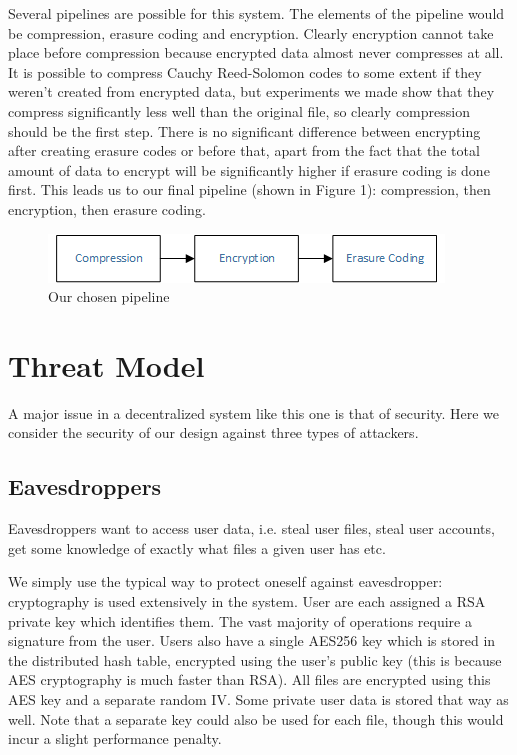 \documentclass{acm_}
\begin{document}
Several pipelines are possible for this system. The elements of the pipeline would be compression, erasure coding and encryption. Clearly encryption cannot take place before compression because encrypted data almost never compresses at all. It is possible to compress Cauchy Reed-Solomon codes to some extent if they weren't created from encrypted data, but experiments we made show that they compress significantly less well than the original file, so clearly compression should be the first step. There is no significant difference between encrypting after creating erasure codes or before that, apart from the fact that the total amount of data to encrypt will be significantly higher if erasure coding is done first. This leads us to our final pipeline (shown in Figure 1): compression, then encryption, then erasure coding.

\begin{figure}
\centering
\includegraphics[scale=0.8]{flow1.png}
\caption{Our chosen pipeline}
\end{figure}

\section{Threat Model}

A major issue in a decentralized system like this one is that of security. Here we consider the security of our design against three types of attackers.

\subsection{Eavesdroppers}

Eavesdroppers want to access user data, i.e. steal user files, steal user accounts, get some knowledge of exactly what files a given user has etc.

We simply use the typical way to protect oneself against eavesdropper: cryptography is used extensively in the system. User are each assigned a RSA private key which identifies them. The vast majority of operations require a signature from the user. Users also have a single AES256 key which is stored in the distributed hash table, encrypted using the user's public key (this is because AES cryptography is much faster than RSA). All files are encrypted using this AES key and a separate random IV. Some private user data is stored that way as well. Note that a separate key could also be used for each file, though this would incur a slight performance penalty.
\end{document}
